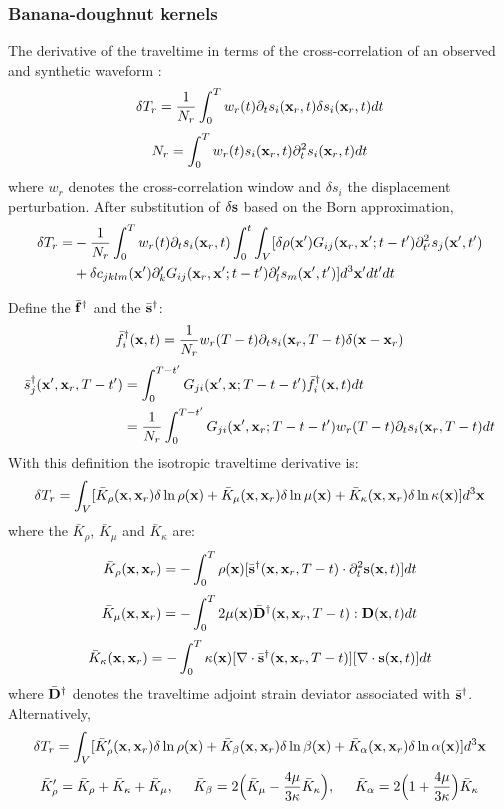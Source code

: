 \subsubsection{Banana-doughnut kernels}
The \Frechet derivative of the traveltime in terms of the cross-correlation
of an observed and synthetic waveform
:
\[ \delta T_r=\frac{1}{N_r}\int_0^Tw_r(t)\partial_ts_i(\mathbf{x}_r,t)\delta s_i(\mathbf{x}_r,t)dt \]
\[ N_r=\int_0^Tw_r(t)s_i(\mathbf{x}_r,t)\partial_t^2s_i(\mathbf{x}_r,t)dt \]
where $w_r$ denotes the cross-correlation window and $\delta s_i$ the displacement perturbation.
After substitution of $\delta\mathbf{s}$ based on the Born approximation,
\begin{align*}
  \delta T_r= & -\frac{1}{N_r}\int_0^Tw_r(t)\partial_ts_i(\mathbf{x}_r,t)\int_0^t\int_V[\delta\rho(\mathbf{x}')G_{ij}(\mathbf{x}_r,\mathbf{x}';t-t')\partial_{t'}^2s_j(\mathbf{x}',t') \\
    & +\delta c_{jklm}(\mathbf{x}')\partial_k^\prime G_{ij}(\mathbf{x}_r,\mathbf{x}';t-t')\partial_l^\prime s_m(\mathbf{x}',t')]d^3\mathbf{x}'dt'dt
\end{align*}

Define the  $\bar{\mathbf{f}}^\dagger$
and the  $\bar{\mathbf{s}}^\dagger$:
\[ \bar f_i^\dagger(\mathbf{x},t)=\frac{1}{N_r}w_r(T-t)\partial_ts_i(\mathbf{x}_r,T-t)\delta(\mathbf{x}-\mathbf{x}_r) \]
\begin{align*}
  \bar s_j^\dagger(\mathbf{x}',\mathbf{x}_r,T-t') & =\int_0^{T-t'}G_{ji}(\mathbf{x}',\mathbf{x};T-t-t')\bar f_i^\dagger(\mathbf{x},t)dt \\
    & =\frac{1}{N_r}\int_0^{T-t'}G_{ji}(\mathbf{x}',\mathbf{x}_r;T-t-t')w_r(T-t)\partial_ts_i(\mathbf{x}_r,T-t)dt
\end{align*}
With this definition the isotropic traveltime \Frechet derivative is:
\[ \delta T_r=\int_V[\bar K_\rho(\mathbf{x},\mathbf{x}_r)\delta\ln\rho(\mathbf{x})+\bar K_\mu(\mathbf{x},\mathbf{x}_r)\delta\ln\mu(\mathbf{x})+\bar K_\kappa(\mathbf{x},\mathbf{x}_r)\delta\ln\kappa(\mathbf{x})]d^3\mathbf{x} \]
where the 
$\bar K_\rho$, $\bar K_\mu$ and $\bar K_\kappa$ are:
\[ \bar K_\rho(\mathbf{x},\mathbf{x}_r)=-\int_0^T\rho(\mathbf{x})[\bar{\mathbf{s}}^\dagger(\mathbf{x},\mathbf{x}_r,T-t)\cdot\partial_t^2\mathbf{s}(\mathbf{x},t)]dt \]
\[ \bar K_\mu(\mathbf{x},\mathbf{x}_r)=-\int_0^T2\mu(\mathbf{x})\bar{\mathbf{D}}^\dagger(\mathbf{x},\mathbf{x}_r,T-t):\mathbf{D}(\mathbf{x},t)dt \]
\[ \bar K_\kappa(\mathbf{x},\mathbf{x}_r)=-\int_0^T\kappa(\mathbf{x})[\nabla\cdot\bar{\mathbf{s}}^\dagger(\mathbf{x},\mathbf{x}_r,T-t)][\nabla\cdot\mathbf{s}(\mathbf{x},t)]dt \]
where $\bar{\mathbf{D}}^\dagger$ denotes the traveltime adjoint strain deviator
associated with $\bar{\mathbf{s}}^\dagger$.
Alternatively,
\[ \delta T_r=\int_V[\bar K_\rho^\prime(\mathbf{x},\mathbf{x}_r)\delta\ln\rho(\mathbf{x})+\bar K_\beta(\mathbf{x},\mathbf{x}_r)\delta\ln\beta(\mathbf{x})+\bar K_\alpha(\mathbf{x},\mathbf{x}_r)\delta\ln\alpha(\mathbf{x})]d^3\mathbf{x} \]
\[ \bar K_\rho^\prime=\bar K_\rho+\bar K_\kappa+\bar K_\mu, \hspace{5mm} \bar K_\beta=2\Big(\bar K_\mu-\frac{4\mu}{3\kappa}\bar K_\kappa\Big), \hspace{5mm} \bar K_\alpha=2\Big(1+\frac{4\mu}{3\kappa}\Big)\bar K_\kappa \]


